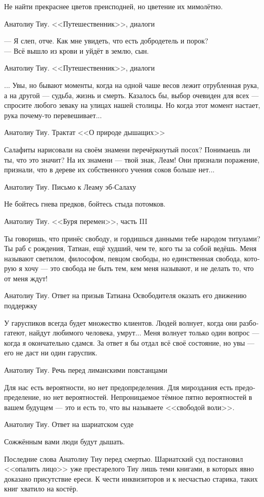 \documentclass[a4paper,12pt,fleqn]{book}\usepackage{polyglossia}\setdefaultlanguage[babelshorthands=true]{russian}\setotherlanguage{english}\defaultfontfeatures{Ligatures=TeX,Mapping=tex-text}\usepackage{xcolor}\newcommand{\ml}[3]{#2}
\begin{document}
{\epigraph
{Не найти прекраснее цветов преисподней, но цветение их мимолётно.}
{Анатолиу Тиу.
<<Путешественник>>, диалоги}

\epigraph
{--- Я слеп, отче.
Как мне увидеть, что есть добродетель и порок?\\
--- Всё вышло из крови и уйдёт в землю, сын.}
{Анатолиу Тиу.
<<Путешественник>>, диалоги}

\epigraph
{... Увы, но бывают моменты, когда на одной чаше весов лежит отрубленная рука, а на другой --- судьба, жизнь и смерть.
Казалось бы, выбор очевиден для всех --- спросите любого зеваку на улицах нашей столицы.
Но когда этот момент настает, рука почему-то перевешивает...}
{Анатолиу Тиу.
Трактат <<О природе дышащих>>}

\epigraph
{Салафиты нарисовали на своём знамени перечёркнутый посох?
Понимаешь ли ты, что это значит?
На их знамени --- твой знак, Леам!
Они признали поражение, признали, что в дереве их собственного учения соков больше нет...}
{Анатолиу Тиу.
Письмо к Леаму эб-Салаху}

\epigraph
{Не бойтесь гнева предков, бойтесь стыда потомков.}
{Анатолиу Тиу.
<<Буря перемен>>, часть III}

\epigraph
{Ты говоришь, что принёс свободу, и гордишься данными тебе народом титулами?
Ты раб с рождения, Татиан, ещё худший, чем те, кого ты за собой ведёшь.
Меня называют светилом, философом, певцом свободы, но единственная свобода, которую я хочу --- это свобода не быть тем, кем меня называют, и не делать то, что от меня ждут!}
{Анатолиу Тиу.
Ответ на призыв Татиана Освободителя оказать его движению поддержку}

\epigraph
{У гаруспиков всегда будет множество клиентов.
Людей волнует, когда они разбогатеют, найдут любимого человека, умрут...
Меня волнует только один вопрос --- когда я окончательно сдамся.
За ответ я бы отдал всё своё состояние, но увы --- его не даст ни один гаруспик.}
{Анатолиу Тиу.
Речь перед лиманскими повстанцами}

\epigraph
{Для нас есть вероятности, но нет предопределения.
Для мироздания есть предопределение, но нет вероятностей.
Непроницаемое тёмное пятно вероятностей в вашем будущем --- это и есть то, что вы называете <<свободой воли>>.}
{Анатолиу Тиу.
Ответ на шариатском суде}

\epigraph
{Сожжённым вами люди будут дышать.}
{Последние слова Анатолиу Тиу перед смертью.
Шариатский суд постановил <<опалить лицо>> уже престарелого Тиу лишь теми книгами, в которых явно доказано присутствие ереси.
К чести инквизиторов и к несчастью старика, таких книг хватило на костёр.}

}
\end{document}
